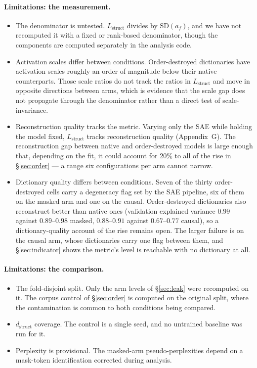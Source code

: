 \documentclass{article} %
\newcommand{\red}[1]{\textcolor{red}{#1}}
\newcommand{\opentag}[1]{\textcolor{red}{\textsuperscript{[\ref{#1}]}}}
\newcommand{\pend}[2]{\red{#1}\opentag{#2}}
\renewcommand{\red}[1]{#1}
\renewcommand{\opentag}[1]{}
\renewcommand{\pend}[2]{#1}
\newcommand{\Lstruct}{\ensuremath{L_{\mathrm{struct}}}}
\newcommand{\dstruct}{\ensuremath{d_{\mathrm{struct}}}}
\begin{document}
\paragraph{Limitations: the measurement.}
\begin{itemize}[leftmargin=1.2em]
\item \pend{The denominator is untested. \Lstruct{} divides by $\mathrm{SD}(a_f)$, and we have not
recomputed it with a fixed or rank-based denominator, though the components are computed separately
in the analysis code.}{t:denominator}
\item Activation scales differ between conditions. Order-destroyed dictionaries have activation
scales roughly an order of magnitude below their native counterparts. Those scale ratios do not
track the ratios in \Lstruct{} and move in opposite directions between arms, which is evidence that
the scale gap does not propagate through the denominator rather than a direct test of
scale-invariance.
\item Reconstruction quality tracks the metric. Varying only the SAE while holding the model fixed,
\Lstruct{} tracks reconstruction quality (Appendix~G). \pend{The reconstruction gap between native
and order-destroyed models is large enough that, depending on the fit, it could account for 20\% to
all of the rise in \S\ref{sec:order}}{c:dose} --- a range six configurations per arm cannot narrow.
\item Dictionary quality differs between conditions. Seven of the thirty order-destroyed cells
carry a degeneracy flag set by the SAE pipeline, six of them on the masked arm and one on the
causal. Order-destroyed dictionaries also reconstruct better than native ones (validation explained
variance $0.99$ against $0.89$--$0.98$ masked, $0.88$--$0.91$ against $0.67$--$0.77$ causal), so a
dictionary-quality account of the rise remains open. The larger failure is on the causal arm, whose
dictionaries carry one flag between them, and \S\ref{sec:indicator} shows the metric's level is
reachable with no dictionary at all.
\end{itemize}

\paragraph{Limitations: the comparison.}
\begin{itemize}[leftmargin=1.2em]
\item \pend{The fold-disjoint split. Only the arm levels of \S\ref{sec:leak} were recomputed on it.
The corpus control of \S\ref{sec:order} is computed on the original split, where the contamination
is common to both conditions being compared.}{t:folddisjoint}
\item \pend{\dstruct{} coverage. The control is a single seed, and no untrained baseline was run
for it.}{t:dstructuntrained}
\item Perplexity is provisional. The masked-arm pseudo-perplexities depend on a mask-token
identification corrected during analysis.
\end{itemize}
\end{document}
